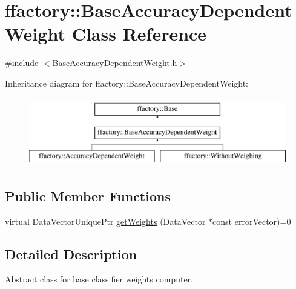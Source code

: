 \hypertarget{classffactory_1_1_base_accuracy_dependent_weight}{\section{ffactory\-:\-:Base\-Accuracy\-Dependent\-Weight Class Reference}
\label{classffactory_1_1_base_accuracy_dependent_weight}
}


{\ttfamily \#include $<$Base\-Accuracy\-Dependent\-Weight.\-h$>$}

Inheritance diagram for ffactory\-:\-:Base\-Accuracy\-Dependent\-Weight\-:\begin{figure}[H]
\begin{center}
\leavevmode
\includegraphics[height=3.000000cm]{classffactory_1_1_base_accuracy_dependent_weight}
\end{center}
\end{figure}
\subsection*{Public Member Functions}
\begin{DoxyCompactItemize}
\item 
virtual Data\-Vector\-Unique\-Ptr \hyperlink{classffactory_1_1_base_accuracy_dependent_weight_a0baa145415e5e75b3b90c787c7e5a879}{get\-Weights} (Data\-Vector $\ast$const error\-Vector)=0
\end{DoxyCompactItemize}


\subsection{Detailed Description}
Abstract class for base classifier weights computer. 

